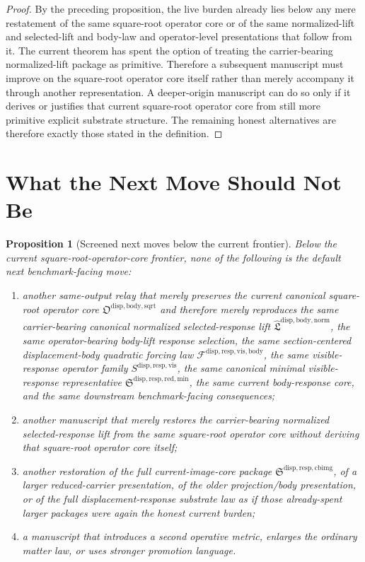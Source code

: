 \documentclass[11pt]{article}
\newcommand{\NormalizedLiftPackage}{\widehat{\mathfrak L}^{\mathrm{disp,body,norm}}}
\newcommand{\SquareRootOperatorCore}{\mathfrak O^{\mathrm{disp,body,sqrt}}}
\newcommand{\VisibleBodyForcingLaw}{\mathscr F^{\mathrm{disp,resp,vis,body}}}
\newcommand{\VisibleResponseOperator}{S^{\mathrm{disp,resp,vis}}}
\newcommand{\MinimalReducedStructure}{\mathfrak S^{\mathrm{disp,resp,red,min}}}
\newcommand{\CurrentBodyImageCore}{\mathfrak S^{\mathrm{disp,resp,cbimg}}}
\newtheorem{proposition}{Proposition}
\begin{document}
\begin{proof}
By the preceding proposition, the live burden already lies below any mere restatement of the same square-root operator core or of the same normalized-lift and selected-lift and body-law and operator-level presentations that follow from it. The current theorem has spent the option of treating the carrier-bearing normalized-lift package as primitive. Therefore a subsequent manuscript must improve on the square-root operator core itself rather than merely accompany it through another representation. A deeper-origin manuscript can do so only if it derives or justifies that current square-root operator core from still more primitive explicit substrate structure. The remaining honest alternatives are therefore exactly those stated in the definition.
\end{proof}

\section{What the Next Move Should Not Be}

\begin{proposition}[Screened next moves below the current frontier]
Below the current square-root-operator-core frontier, none of the following is the default next benchmark-facing move:
\begin{enumerate}
    \item another same-output relay that merely preserves the current canonical square-root operator core \(\SquareRootOperatorCore\) and therefore merely reproduces the same carrier-bearing canonical normalized selected-response lift \(\NormalizedLiftPackage\), the same operator-bearing body-lift response selection, the same section-centered displacement-body quadratic forcing law \(\VisibleBodyForcingLaw\), the same visible-response operator family \(\VisibleResponseOperator\), the same canonical minimal visible-response representative \(\MinimalReducedStructure\), the same current body-response core, and the same downstream benchmark-facing consequences;
    \item another manuscript that merely restores the carrier-bearing normalized selected-response lift from the same square-root operator core without deriving that square-root operator core itself;
    \item another restoration of the full current-image-core package \(\CurrentBodyImageCore\), of a larger reduced-carrier presentation, of the older projection/body presentation, or of the full displacement-response substrate law as if those already-spent larger packages were again the honest current burden;
    \item a manuscript that introduces a second operative metric, enlarges the ordinary matter law, or uses stronger promotion language.
\end{enumerate}
\end{proposition}
\end{document}
